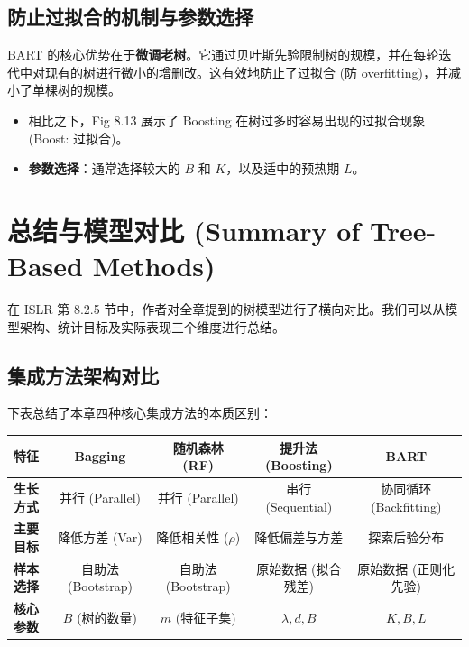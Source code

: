 \documentclass[UTF8]{ctexart}
\numberwithin{equation}{section}
\begin{document}
\subsection{防止过拟合的机制与参数选择}
BART 的核心优势在于\textbf{微调老树}。它通过贝叶斯先验限制树的规模，并在每轮迭代中对现有的树进行微小的增删改。这有效地防止了过拟合 (防 overfitting)，并减小了单棵树的规模。
\begin{itemize}
    \item 相比之下，Fig 8.13 展示了 Boosting 在树过多时容易出现的过拟合现象 (Boost: 过拟合)。
    \item \textbf{参数选择}：通常选择较大的 $B$ 和 $K$，以及适中的预热期 $L$。
\end{itemize}


\section{总结与模型对比 (Summary of Tree-Based Methods)}
在 ISLR 第 8.2.5 节中，作者对全章提到的树模型进行了横向对比。我们可以从模型架构、统计目标及实际表现三个维度进行总结。

\subsection{集成方法架构对比}
下表总结了本章四种核心集成方法的本质区别：

\begin{table}[h]
\centering
\begin{tabular}{|l|c|c|c|c|}
\hline
\textbf{特征} & \textbf{Bagging} & \textbf{随机森林 (RF)} & \textbf{提升法 (Boosting)} & \textbf{BART} \\ \hline
\textbf{生长方式} & 并行 (Parallel) & 并行 (Parallel) & 串行 (Sequential) & 协同循环 (Backfitting) \\ \hline
\textbf{主要目标} & 降低方差 (Var) & 降低相关性 ($\rho$) & 降低偏差与方差 & 探索后验分布 \\ \hline
\textbf{样本选择} & 自助法 (Bootstrap) & 自助法 (Bootstrap) & 原始数据 (拟合残差) & 原始数据 (正则化先验) \\ \hline
\textbf{核心参数} & $B$ (树的数量) & $m$ (特征子集) & $\lambda, d, B$ & $K, B, L$ \\ \hline
\end{tabular}
\end{table}
\end{document}
